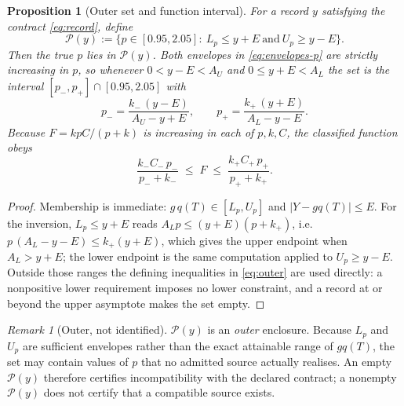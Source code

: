 \documentclass[11pt]{article}
\newtheorem{proposition}[theorem]{Proposition}
\theoremstyle{definition}
\theoremstyle{remark}
\newtheorem{remark}[theorem]{Remark}
\begin{document}
\begin{proposition}[Outer set and function interval]\label{prop:outer}
For a record $y$ satisfying the contract \eqref{eq:record}, define
\begin{equation}
\mathcal P(y):=\bigl\{p\in[0.95,2.05]:\ L_p\le y+E\ \text{and}\ U_p\ge y-E\bigr\}.
\label{eq:outer}
\end{equation}
Then the true $p$ lies in $\mathcal P(y)$. Both envelopes in
\eqref{eq:envelopes-p} are strictly increasing in $p$, so whenever
$0<y-E<A_U$ and $0\le y+E<A_L$ the set is the interval
$[p_-,p_+]\cap[0.95,2.05]$ with
\begin{equation}
p_-=\frac{k_-\,(y-E)}{A_U-y+E},\qquad
p_+=\frac{k_+\,(y+E)}{A_L-y-E}.
\label{eq:inversion}
\end{equation}
Because $F=kpC/(p+k)$ is increasing in each of $p,k,C$, the classified function
obeys
\begin{equation}
\frac{k_-C_-\,p_-}{p_-+k_-}\;\le\;F\;\le\;\frac{k_+C_+\,p_+}{p_++k_+} .
\label{eq:flux-interval}
\end{equation}
\end{proposition}

\begin{proof}
Membership is immediate: $g\,q(T)\in[L_p,U_p]$ and $|Y-gq(T)|\le E$. For the
inversion, $L_p\le y+E$ reads $A_Lp\le(y+E)(p+k_+)$, i.e.\
$p\,(A_L-y-E)\le k_+(y+E)$, which gives the upper endpoint when
$A_L>y+E$; the lower endpoint is the same computation applied to $U_p\ge y-E$.
Outside those ranges the defining inequalities in \eqref{eq:outer} are used
directly: a nonpositive lower requirement imposes no lower constraint, and a
record at or beyond the upper asymptote makes the set empty.
\end{proof}

\begin{remark}[Outer, not identified]
$\mathcal P(y)$ is an \emph{outer} enclosure. Because $L_p$ and $U_p$ are
sufficient envelopes rather than the exact attainable range of $gq(T)$, the set
may contain values of $p$ that no admitted source actually realises. An empty
$\mathcal P(y)$ therefore certifies incompatibility with the declared contract;
a nonempty $\mathcal P(y)$ does not certify that a compatible source exists.
\end{remark}
\end{document}
